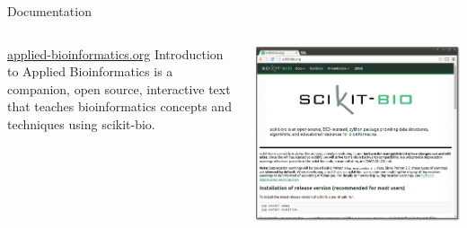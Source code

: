 \documentclass[final,t]{beamer}
\begin{document}
\begin{frame}{}
\begin{columns}[t]
\begin{column}{.3\linewidth}
\begin{block}{Documentation}
\begin{columns}
\begin{column}{.45\linewidth}
\begin{minipage}[c][20cm][c]{\linewidth}
                    \end{minipage}
                    \begin{minipage}[c][15cm][c]{\linewidth}
                        \href{http://applied-bioinformatics.org}{\color{blue}\underline{applied-bioinformatics.org}}
                        \newline\newline
                        Introduction to Applied Bioinformatics is a companion, open source, interactive text that teaches bioinformatics concepts and techniques using scikit-bio.
                    \end{minipage}
                \end{column}
                \begin{column}{.45\linewidth}
                    \begin{minipage}[c][20cm][c]{\linewidth}
                        \includegraphics[width=1\linewidth]{assets/website}\\
                    \end{minipage}
                    \begin{minipage}[c][15cm][c]{\linewidth}

\end{minipage}
\end{column}
\end{columns}
\end{block}
\end{column}
\end{columns}
\end{frame}
\end{document}
